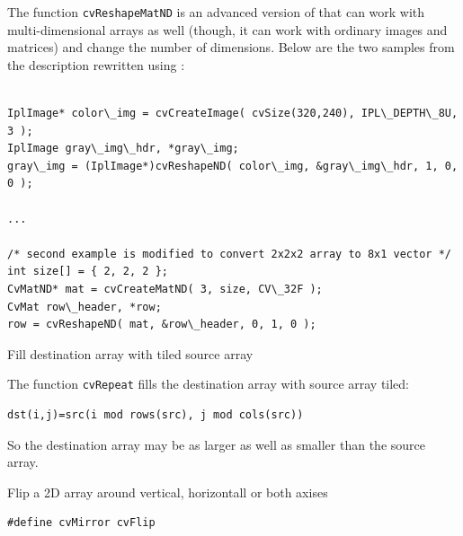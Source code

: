The function \texttt{cvReshapeMatND} is an advanced version of  that can work with multi-dimensional arrays as well (though, it can work with ordinary images and matrices) and change the number of dimensions. Below are the two samples from the  description rewritten using :

\begin{lstlisting}

IplImage* color\_img = cvCreateImage( cvSize(320,240), IPL\_DEPTH\_8U, 3 );
IplImage gray\_img\_hdr, *gray\_img;
gray\_img = (IplImage*)cvReshapeND( color\_img, &gray\_img\_hdr, 1, 0, 0 );

...

/* second example is modified to convert 2x2x2 array to 8x1 vector */
int size[] = { 2, 2, 2 };
CvMatND* mat = cvCreateMatND( 3, size, CV\_32F );
CvMat row\_header, *row;
row = cvReshapeND( mat, &row\_header, 0, 1, 0 );

\end{lstlisting}

\label{Repeat}

Fill destination array with tiled source array


\begin{description}
\end{description}


The function \texttt{cvRepeat} fills the destination array with source array tiled:

\begin{lstlisting}
dst(i,j)=src(i mod rows(src), j mod cols(src))
\end{lstlisting}

So the destination array may be as larger as well as smaller than the source array.


\label{Flip}

Flip a 2D array around vertical, horizontall or both axises


\begin{lstlisting}
#define cvMirror cvFlip
\end{lstlisting}


